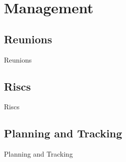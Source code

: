 \newpage
\section{Management}

\subsection{Reunions}
Reunions

\subsection{Riscs}
Riscs

\subsection{Planning and Tracking}
Planning and Tracking
